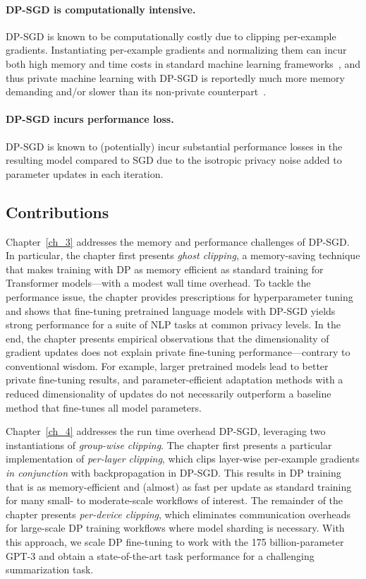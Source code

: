 \paragraph{DP-SGD is computationally intensive.} DP-SGD is known to be computationally costly due to clipping per-example gradients.
Instantiating per-example gradients and normalizing them can incur both high memory and time costs in standard machine learning frameworks~\citep{paszke2019pytorch,frostig2018compiling}, and thus private machine learning with DP-SGD is reportedly much more memory demanding and/or slower than its non-private counterpart~\citep{carlini2019secret,hoory2021learning}. 

\paragraph{DP-SGD incurs performance loss.}
DP-SGD is known to (potentially) incur substantial performance losses in the resulting model compared to SGD due to the isotropic privacy noise added to parameter updates in each iteration.\\

\subsection{Contributions}

Chapter~\ref{ch_3} addresses the memory and performance challenges of DP-SGD.
In particular, the chapter first presents \emph{ghost clipping}, a memory-saving technique that makes training with DP as memory efficient as standard training for Transformer models---with a modest wall time overhead.
To tackle the performance issue, the chapter provides prescriptions for hyperparameter tuning and shows that fine-tuning pretrained language models with DP-SGD yields strong performance for a suite of NLP tasks at common privacy levels.
In the end, the chapter presents empirical observations that the dimensionality of gradient updates does not explain private fine-tuning performance---contrary to conventional wisdom.
For example, larger pretrained models lead to better private fine-tuning results, and parameter-efficient adaptation methods with a reduced dimensionality of updates do not necessarily outperform a baseline method that fine-tunes all model parameters.

Chapter~\ref{ch_4} addresses the run time overhead DP-SGD, leveraging
two instantiations of \emph{group-wise clipping}.
The chapter first presents a particular implementation of \emph{per-layer clipping}, which clips layer-wise per-example gradients \emph{in conjunction} with backpropagation in DP-SGD. 
This results in DP training that is as memory-efficient and (almost) as fast per update as standard training for many small- to moderate-scale workflows of interest.
The remainder of the chapter presents \emph{per-device clipping}, which eliminates communication overheads for large-scale DP training workflows where model sharding is necessary.
With this approach, we scale DP fine-tuning to work with the 175 billion-parameter GPT-3 and obtain a state-of-the-art task performance for a challenging summarization task.


